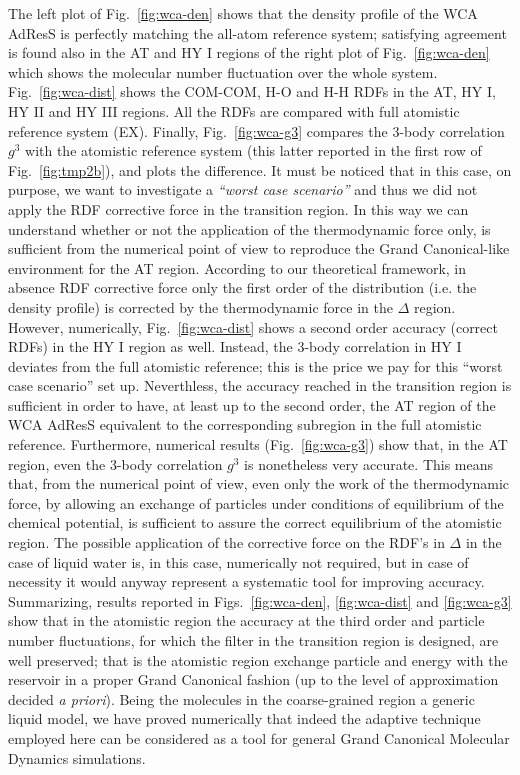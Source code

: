 \documentclass[aip,jcp,a4paper,reprint,onecolumn]{revtex4-1}
\newcommand{\redc}[1]{{\color{red} #1}}
\newcommand{\HY}{{\Delta}}
\begin{document}
  The left plot of Fig.~\ref{fig:wca-den} shows that
  the density profile of the
  WCA AdResS is perfectly matching the all-atom reference system; satisfying agreement is found also in the AT and HY I regions of the right plot of Fig.~\ref{fig:wca-den} which shows the molecular
  number fluctuation over the whole system.
Fig.~\ref{fig:wca-dist} shows the COM-COM, H-O and H-H
    RDFs in the AT, HY I, HY II and HY III regions.
    All the RDFs are compared with full atomistic reference system (EX).
    Finally, Fig.~\ref{fig:wca-g3} compares the 3-body correlation $g^3$
    with the atomistic reference
    system (this latter reported in the first row of Fig.~\ref{fig:tmp2b}), and plots the difference. It must be noticed that in this case, on purpose, we want to investigate a {\it ``worst case scenario''} and thus we did not apply the RDF corrective force in the transition region. In this way we can understand whether or not the application of the thermodynamic force only, is sufficient from the numerical point of view to reproduce the Grand Canonical-like environment for the AT region.
    According to our theoretical framework, in absence RDF corrective force only the first order of the distribution (i.e. the density profile)
    is corrected by the thermodynamic force in the $\HY$ region.
    However, numerically, Fig.~\ref{fig:wca-dist} shows a second order accuracy (correct RDFs) in the HY I region as well. Instead, the 3-body
    correlation in HY I deviates from the full atomistic reference; this is the price we pay for this ``worst case scenario'' set up. \redc{Neverthless}, the accuracy reached in the transition region is sufficient in order to have, at least up to the second order, the AT region of the WCA AdResS equivalent to the corresponding subregion in the full atomistic reference.
    Furthermore, numerical results  (Fig.~\ref{fig:wca-g3}) show that, in the AT region, even the 3-body correlation $g^3$ is nonetheless very accurate. 
  This means that, from the numerical point of view, even only the work of the thermodynamic force, by allowing an exchange of particles under conditions of equilibrium of the chemical potential, is sufficient to assure the correct equilibrium of the atomistic region. The possible application of the corrective force on the RDF's in $\Delta$ in the case of liquid water is, in this case, numerically not required, but in case of necessity it would anyway represent a systematic tool for improving accuracy. 
  Summarizing, results reported in Figs.~\ref{fig:wca-den}, \ref{fig:wca-dist} and \ref{fig:wca-g3} show that in the atomistic region the accuracy at the third order and particle number fluctuations, for which the filter in the transition region is designed, are well preserved; that is the atomistic region exchange particle and energy with the reservoir in a proper Grand Canonical fashion (up to the level of approximation decided {\it a priori}). Being the molecules in the coarse-grained region a generic liquid model, we have proved numerically that indeed the adaptive technique employed here can be considered as a tool for general Grand Canonical Molecular Dynamics simulations.  
\end{document}
